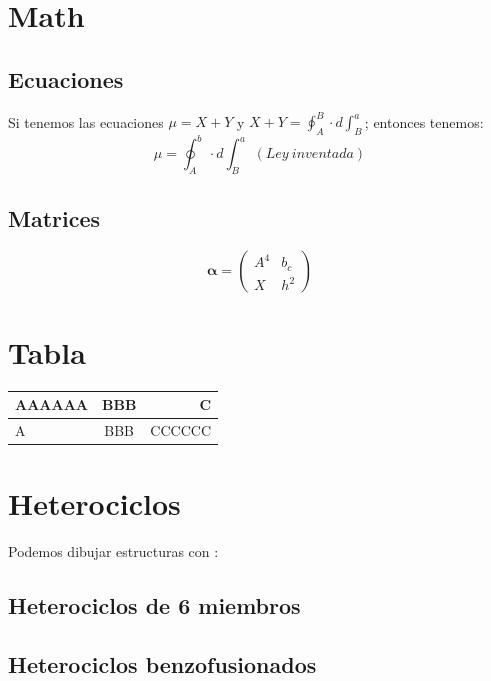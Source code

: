 \documentclass[10pt,a4paper]{book}
\begin{document}
\cleardoublepage

\chapter{Math}
\section{Ecuaciones}
Si tenemos las ecuaciones $\mu = X+Y$ y $X+Y = \oint_A^B \cdot d\int_B^a$; entonces tenemos:
\begin{equation}
\mu = \oint_A^b \cdot d\int_B^a \ (Ley\ inventada)
\end{equation}

\section{Matrices}
\begin{displaymath}
\mathbf{\alpha} = 
\left(\begin{array}{ccc}
A^4 & b_c \\
X & h^2
\end{array} \right)
\end{displaymath}


\cleardoublepage

\chapter{Tabla}

\begin{tabular}[r]{|l|c||r|}

\hline
AAAAAA & BBB & C \\
\hline
A & BBB & CCCCCC \\
\hline
\end{tabular}

\chapter{Heterociclos}
Podemos dibujar estructuras con \XyMTeX :
\section{Heterociclos de 6 miembros}


\section{Heterociclos benzofusionados}


\cleardoublepage
\end{document}
